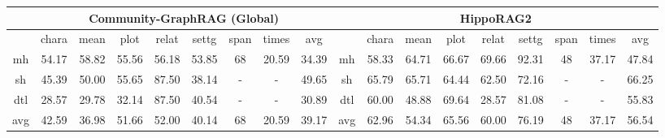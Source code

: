 \begin{table}[!htb]
{\begin{tabular}{ccccccccc|ccccccccc}
\midrule
\multicolumn{1}{l}{} 
& \multicolumn{8}{c|}{\textbf{Community-GraphRAG (Global)}} 
& \multicolumn{9}{c}{\textbf{HippoRAG2}} \\ 
\midrule
\multicolumn{1}{l}{} 
& chara & mean & plot & relat & settg & span & times & avg
& \multicolumn{1}{l}{} & chara & mean & plot & relat & settg & span & times & avg \\

mh & 54.17 & 58.82 & 55.56 & 56.18 & 53.85 & 68 & 20.59 & 34.39
   & mh & 58.33 & 64.71 & 66.67 & 69.66 & 92.31 & 48 & 37.17 & 47.84 \\
sh & 45.39 & 50.00 & 55.65 & 87.50 & 38.14 & - & - & 49.65
   & sh & 65.79 & 65.71 & 64.44 & 62.50 & 72.16 & - & - & 66.25 \\
dtl & 28.57 & 29.78 & 32.14 & 87.50 & 40.54 & - & - & 30.89
    & dtl & 60.00 & 48.88 & 69.64 & 28.57 & 81.08 & - & - & 55.83 \\
avg & 42.59 & 36.98 & 51.66 & 52.00 & 40.14 & 68 & 20.59 & 39.17
    & avg & 62.96 & 54.34 & 65.56 & 60.00 & 76.19 & 48 & 37.17 & 56.54 \\

\bottomrule
\end{tabular}
}
\vspace{-0.1in}
\end{table}





